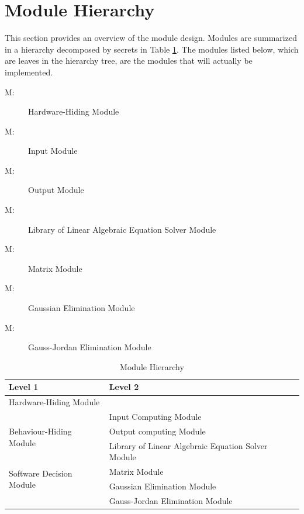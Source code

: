 \documentclass[12pt, titlepage]{article}
\newcounter{mnum}
\newcommand{\mthemnum}{M\themnum}
\begin{document}
\section{Module Hierarchy} \label{SecMH}

This section provides an overview of the module design. Modules are summarized
in a hierarchy decomposed by secrets in Table \ref{TblMH}. The modules listed
below, which are leaves in the hierarchy tree, are the modules that will
actually be implemented.

\begin{description}
\item [ \mthemnum \label{mHH}:] Hardware-Hiding Module
\item [ \mthemnum \label{mIC}:] Input Module
\item [ \mthemnum \label{mOC}:] Output Module
\item [ \mthemnum \label{mLL}:] Library of Linear Algebraic Equation Solver Module
\item [ \mthemnum \label{mMM}:] Matrix Module
\item [ \mthemnum \label{mGE}:] Gaussian Elimination Module
\item [ \mthemnum \label{mGJ}:] Gauss-Jordan Elimination Module

\end{description}


\begin{table}[h!]
\centering
\begin{tabular}{p{} p{}}
\toprule
\textbf{Level 1} & \textbf{Level 2}\\
\midrule

{Hardware-Hiding Module} & ~ \\
\midrule

\multirow{3}{0.3\textwidth}{Behaviour-Hiding Module} 
& Input Computing Module\\
& Output computing Module\\
& Library of Linear Algebraic Equation Solver Module\\


\midrule

\multirow{2}{0.3\textwidth}{Software Decision Module}  
& Matrix Module\\

& Gaussian Elimination Module\\

& Gauss-Jordan Elimination Module\\


\bottomrule

\end{tabular}
\caption{Module Hierarchy}
\label{TblMH}
\end{table}
\end{document}
